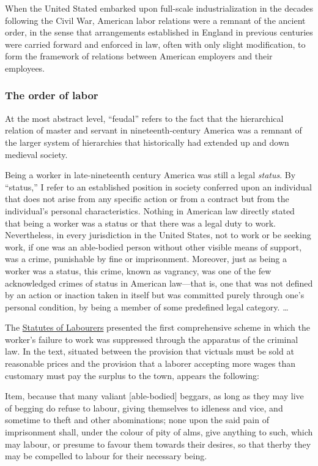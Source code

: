 \documentclass[
  letterpaper,
  11pt,
  DIV=9,
  openright]{scrbook}
\renewenvironment{quote}{
  \list{}{\leftmargin=2em\rightmargin=2em}
  \item\relax\small
}
{\endlist}
\begin{document}
When the United Stated embarked upon full-scale industrialization in the
decades following the Civil War, American labor relations were a remnant
of the ancient order, in the sense that arrangements established in
England in previous centuries were carried forward and enforced in law,
often with only slight modification, to form the framework of relations
between American employers and their employees.

\subsubsection{The order of labor}\label{the-order-of-labor}

At the most abstract level, ``feudal'' refers to the fact that the
hierarchical relation of master and servant in nineteenth-century
America was a remnant of the larger system of hierarchies that
historically had extended up and down medieval society.

Being a worker in late-nineteenth century America was still a legal
\emph{status}. By ``status,'' I refer to an established position in
society conferred upon an individual that does not arise from any
specific action or from a contract but from the individual's personal
characteristics. Nothing in American law directly stated that being a
worker was a status or that there was a legal duty to work.
Nevertheless, in every jurisdiction in the United States, not to work or
be seeking work, if one was an able-bodied person without other visible
means of support, was a crime, punishable by fine or imprisonment.
Moreover, just as being a worker was a status, this crime, known as
vagrancy, was one of the few acknowledged crimes of status in American
law---that is, one that was not defined by an action or inaction taken
in itself but was committed purely through one's personal condition, by
being a member of some predefined legal category. \ldots{}

The \href{../StatutesOfLabourers/}{Statutes of Labourers} presented the
first comprehensive scheme in which the worker's failure to work was
suppressed through the apparatus of the criminal law. In the text,
situated between the provision that victuals must be sold at reasonable
prices and the provision that a laborer accepting more wages than
customary must pay the surplus to the town, appears the following:

\begin{quote}
Item, because that many valiant {[}able-bodied{]} beggars, as long as
they may live of begging do refuse to labour, giving themselves to
idleness and vice, and sometime to theft and other abominations; none
upon the said pain of imprisonment shall, under the colour of pity of
alms, give anything to such, which may labour, or presume to favour them
towards their desires, so that therby they may be compelled to labour
for their necessary being.
\end{quote}
\end{document}
